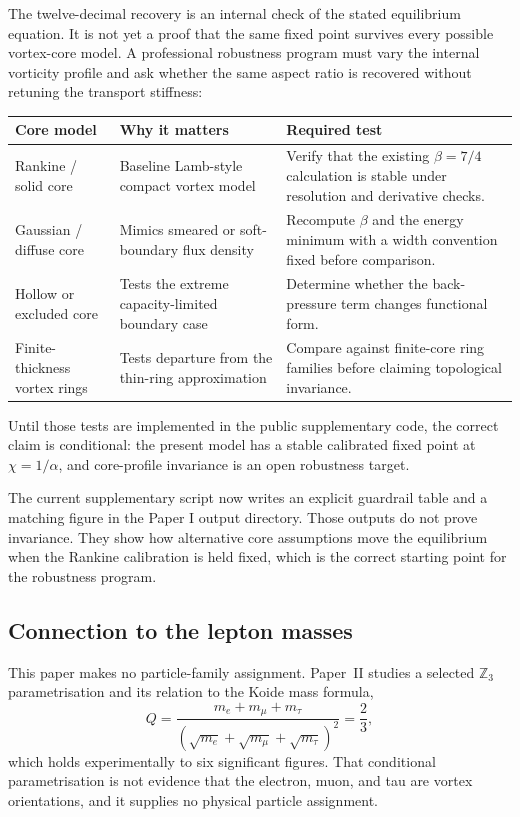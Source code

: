 \documentclass[11pt]{article}
\begin{document}
The twelve-decimal recovery is an internal check of the stated equilibrium
equation. It is not yet a proof that the same fixed point survives every possible
vortex-core model. A professional robustness program must vary the internal
vorticity profile and ask whether the same aspect ratio is recovered without
retuning the transport stiffness:
\begin{center}
\small
\begin{tabular}{p{}p{}p{}}
\toprule
\textbf{Core model} & \textbf{Why it matters} & \textbf{Required test}\\
\midrule
Rankine / solid core & Baseline Lamb-style compact vortex model & Verify that the existing $\beta=7/4$ calculation is stable under resolution and derivative checks.\\
Gaussian / diffuse core & Mimics smeared or soft-boundary flux density & Recompute $\beta$ and the energy minimum with a width convention fixed before comparison.\\
Hollow or excluded core & Tests the extreme capacity-limited boundary case & Determine whether the back-pressure term changes functional form.\\
Finite-thickness vortex rings & Tests departure from the thin-ring approximation & Compare against finite-core ring families before claiming topological invariance.\\
\bottomrule
\end{tabular}
\end{center}
Until those tests are implemented in the public supplementary code, the correct
claim is conditional: the present model has a stable calibrated fixed point at
$\chi=1/\alpha$, and core-profile invariance is an open robustness target.

The current supplementary script now writes an explicit guardrail table and a
matching figure in the Paper I output directory.
Those outputs do not prove invariance. They show how alternative core
assumptions move the equilibrium when the Rankine calibration is held fixed,
which is the correct starting point for the robustness program.

\subsection{Connection to the lepton masses}

This paper makes no particle-family assignment. Paper~II studies a selected
$\mathbb{Z}_3$ parametrisation and its relation to the Koide mass formula,
\begin{equation*}
  Q = \frac{m_e + m_\mu + m_\tau}
           {(\sqrt{m_e} + \sqrt{m_\mu} + \sqrt{m_\tau})^2}
  = \frac{2}{3},
\end{equation*}
which holds experimentally to six significant figures. That conditional
parametrisation is not evidence that the electron, muon, and tau are vortex
orientations, and it supplies no physical particle assignment.
\end{document}

